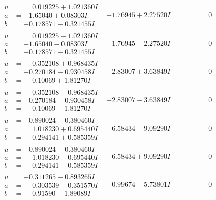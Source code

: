 \documentclass[1p]{elsarticle_modified}
\theoremstyle{definition}
\begin{document}
$$\begin{array}{c|c|c}
\begin{aligned}
u &= \phantom{-}0.019225 + 1.021360 I \\
a &= -1.65040 + 0.08303 I \\
b &= -0.178571 + 0.321455 I\end{aligned}
 & -1.76945 + 2.27520 I & \phantom{-0.000000 } 0 \\ \hline\begin{aligned}
u &= \phantom{-}0.019225 - 1.021360 I \\
a &= -1.65040 - 0.08303 I \\
b &= -0.178571 - 0.321455 I\end{aligned}
 & -1.76945 - 2.27520 I & \phantom{-0.000000 } 0 \\ \hline\begin{aligned}
u &= \phantom{-}0.352108 + 0.968435 I \\
a &= -0.270184 + 0.930458 I \\
b &= \phantom{-}0.10069 + 1.81270 I\end{aligned}
 & -2.83007 + 3.63849 I & \phantom{-0.000000 } 0 \\ \hline\begin{aligned}
u &= \phantom{-}0.352108 - 0.968435 I \\
a &= -0.270184 - 0.930458 I \\
b &= \phantom{-}0.10069 - 1.81270 I\end{aligned}
 & -2.83007 - 3.63849 I & \phantom{-0.000000 } 0 \\ \hline\begin{aligned}
u &= -0.890024 + 0.380460 I \\
a &= \phantom{-}1.018230 + 0.695440 I \\
b &= \phantom{-}0.294141 + 0.585359 I\end{aligned}
 & -6.58434 - 9.09290 I & \phantom{-0.000000 } 0 \\ \hline\begin{aligned}
u &= -0.890024 - 0.380460 I \\
a &= \phantom{-}1.018230 - 0.695440 I \\
b &= \phantom{-}0.294141 - 0.585359 I\end{aligned}
 & -6.58434 + 9.09290 I & \phantom{-0.000000 } 0 \\ \hline\begin{aligned}
u &= -0.311265 + 0.893265 I \\
a &= \phantom{-}0.303539 - 0.351570 I \\
b &= \phantom{-}0.91590 - 1.89089 I\end{aligned}
 & -0.99674 - 5.73801 I & \phantom{-0.000000 } 0 \\ \hline\begin{aligned}

\end{aligned}
\end{array}$$
\end{document}
